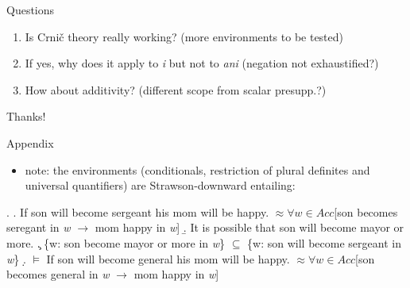 \documentclass[ignorenonframetext,]{beamer}
\providecommand{\tightlist}{%
  \setlength{\itemsep}{0pt}\setlength{\parskip}{0pt}}
\begin{document}
\begin{frame}{Questions}

\begin{enumerate}
\def\labelenumi{\arabic{enumi})}
\item
  Is Crnič theory really working? (more environments to be tested)
\item
  If yes, why does it apply to \emph{i} but not to \emph{ani} (negation
  not exhaustified?)
\item
  How about additivity? (different scope from scalar presupp.?)
\end{enumerate}

\end{frame}

\begin{frame}

\begin{center}
\Huge Thanks!
\end{center}

\end{frame}

\begin{frame}{Appendix}

\begin{itemize}
\tightlist
\item
  note: the environments (conditionals, restriction of plural definites
  and universal quantifiers) are Strawson-downward entailing:
\end{itemize}

\ex. \a. If son will become sergeant his mom will be happy.\newline
\(\approx \forall w \in Acc\){[}son becomes seregant in \emph{w}
\(\rightarrow\) mom happy in \emph{w}{]} \b. It is possible that son
will become mayor or more. \c. \{w: son become mayor or more in
\emph{w}\} \(\subseteq\) \{w: son will become sergeant in \emph{w}\} \d.
\(\models\) If son will become general his mom will be happy.\newline
\(\approx \forall w \in Acc\){[}son becomes general in \emph{w}
\(\rightarrow\) mom happy in \emph{w}{]}

\end{frame}
\end{document}
